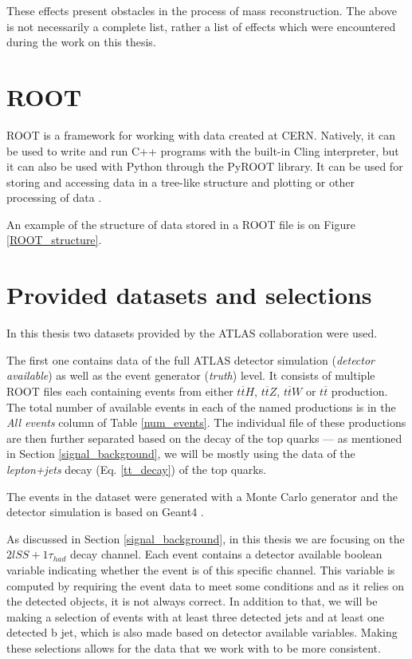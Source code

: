 \documentclass{ctuthesis}
\begin{document}
These effects present obstacles in the process of mass reconstruction. The above is not necessarily a complete list, rather a list of effects which were encountered during the work on this thesis.

\section{ROOT}
ROOT is a framework for working with data created at CERN. Natively, it can be used to write and run C++ programs with the built-in Cling interpreter, but it can also be used with Python through the PyROOT library. It can be used for storing and accessing data in a tree-like structure and plotting or other processing of data \cite{about_root}.

An example of the structure of data stored in a ROOT file is on Figure \ref{ROOT_structure}.

\begin{figure}[h]
\end{figure}

\section{Provided datasets and selections}
\label{datasets_selections}
In this thesis two datasets provided by the ATLAS collaboration were used.

The first one contains data of the full ATLAS detector simulation (\emph{detector available}) as well as the event generator (\emph{truth}) level. It consists of multiple ROOT files each containing events from either $t\overline{t}H$, $t\overline{t}Z$, $t\overline{t}W$ or $t\overline{t}$ production. The total number of available events in each of the named productions is in the \emph{All events} column of Table \ref{num_events}. The individual file of these productions are then further separated based on the decay of the top quarks — as mentioned in Section \ref{signal_background}, we will be mostly using the data of the \emph{lepton+jets} decay (Eq. \ref{tt_decay}) of the top quarks.

The events in the dataset were generated with a Monte Carlo generator and the detector simulation is based on Geant4 \cite{geant}.

As discussed in Section \ref{signal_background}, in this thesis we are focusing on the $2lSS + 1 \tau _{had}$ decay channel. Each event contains a detector available boolean variable indicating whether the event is of this specific channel. This variable is computed by requiring the event data to meet some conditions and as it relies on the detected objects, it is not always correct. In addition to that, we will be making a selection of events with at least three detected jets and at least one detected b jet, which is also made based on detector available variables. Making these selections allows for the data that we work with to be more consistent.
\end{document}
